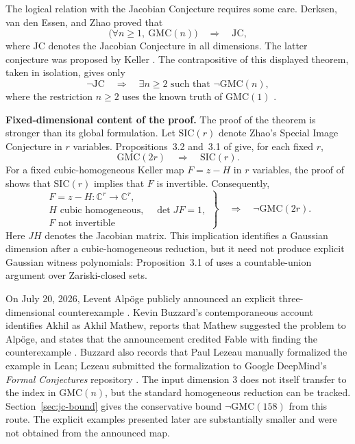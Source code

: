 \documentclass[11pt]{article}
\newcommand{\C}{\mathbb C}
\newcommand{\GMC}{\mathrm{GMC}}
\newcommand{\SIC}{\mathrm{SIC}}
\theoremstyle{remark}
\begin{document}
The logical relation with the Jacobian Conjecture requires some care.  Derksen, van den Essen, and Zhao proved \cite[Theorem~1.6]{DVEZ} that
\[
  \bigl(\forall n\geq1,\ \GMC(n)\bigr)
  \quad\Longrightarrow\quad
  \mathrm{JC},
\]
where $\mathrm{JC}$ denotes the Jacobian Conjecture in all dimensions.  The latter conjecture was proposed by Keller \cite{Keller}.  The contrapositive of this displayed theorem, taken in isolation, gives only
\begin{equation}\label{eq:global-logic}
  \neg\mathrm{JC}
  \quad\Longrightarrow\quad
  \exists n\geq2\text{ such that }\neg\GMC(n),
\end{equation}
where the restriction $n\geq2$ uses the known truth of $\GMC(1)$ \cite[Proposition~4.2]{DVEZ}.

\medskip
\noindent\textbf{Fixed-dimensional content of the proof.}
The proof of the theorem is stronger than its global formulation.  Let $\SIC(r)$ denote Zhao's Special Image Conjecture in $r$ variables.  Propositions~3.2 and~3.1 of \cite{DVEZ} give, for each fixed $r$,
\[
  \GMC(2r)\quad\Longrightarrow\quad\SIC(r).
\]
For a fixed cubic-homogeneous Keller map $F=z-H$ in $r$ variables, the proof of \cite[Theorem~3.7]{Zhao} shows that $\SIC(r)$ implies that $F$ is invertible.  Consequently,
\begin{equation}\label{eq:fixed-logic}
  \left.
  \begin{array}{c}
  F=z-H:\C^r\longrightarrow\C^r,\\
  H\text{ cubic homogeneous},\quad\det JF=1,\\
  F\text{ not invertible}
  \end{array}
  \right\}
  \quad\Longrightarrow\quad
  \neg\GMC(2r).
\end{equation}
Here $JH$ denotes the Jacobian matrix.  This implication identifies a Gaussian dimension after a cubic-homogeneous reduction, but it need not produce explicit Gaussian witness polynomials: Proposition~3.1 of \cite{DVEZ} uses a countable-union argument over Zariski-closed sets.

On July 20, 2026, Levent Alp\"oge publicly announced an explicit three-dimensional counterexample \cite{Alpoge}.  Kevin Buzzard's contemporaneous account identifies Akhil as Akhil Mathew, reports that Mathew suggested the problem to Alp\"oge, and states that the announcement credited Fable with finding the counterexample \cite{Buzzard}.  Buzzard also records that Paul Lezeau manually formalized the example in Lean; Lezeau submitted the formalization to Google DeepMind's \emph{Formal Conjectures} repository \cite{Lezeau}.  The input dimension $3$ does not itself transfer to the index in $\GMC(n)$, but the standard homogeneous reduction can be tracked.  Section~\ref{sec:jc-bound} gives the conservative bound $\neg\GMC(158)$ from this route.  The explicit examples presented later are substantially smaller and were not obtained from the announced map.
\end{document}
